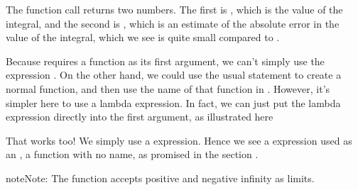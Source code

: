 \documentclass[letterpaper,10pt,english]{sphinxmanual}
\begin{document}
\sphinxAtStartPar
The function call  returns two numbers.  The first is , which is the value of the integral, and the second is , which is an estimate of the absolute error in the value of the integral, which we see is quite small compared to .

\sphinxAtStartPar
Because  requires a function  as its first argument, we can’t simply use the expression .  On the other hand, we could use the usual  statement to create a normal function, and then use the name of that function in .  However, it’s simpler here to use a lambda expression.  In fact, we can just put the lambda expression directly into the first argument, as illustrated here

\begin{sphinxVerbatim}[commandchars=\\\{\}]
     
 
\end{sphinxVerbatim}

\sphinxAtStartPar
That works too!  We simply use a  expression.  Hence we see a  expression used as an , a function with no name, as promised in the section {\hyperref[\detokenize{chap7/chap7_funcs:lambda}]{}}.

\begin{sphinxadmonition}{note}{Note:}
\sphinxAtStartPar
The  function accepts positive and negative infinity as limits.
\end{sphinxadmonition}
\end{document}
